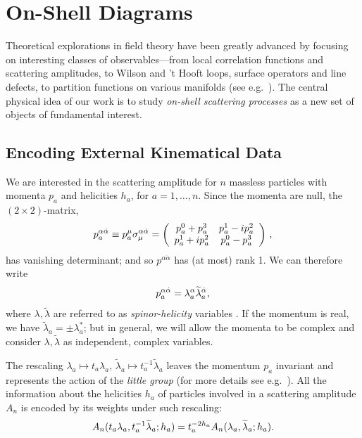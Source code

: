 \documentclass[12pt,hyperref,compress]{JHEP3}
\newcommand{\eq}[1]{\begin{equation}#1\end{equation}}
\begin{document}
\newpage
\section{On-Shell Diagrams}\label{on_shell_diagrams_section}

Theoretical explorations in field theory have been greatly advanced by focusing on interesting classes of observables---from local correlation functions and scattering amplitudes, to Wilson and 't Hooft loops, surface operators and line defects, to partition functions on various manifolds (see e.g.\ \cite{Pestun:2007rz,Gaiotto:2008ak}). The central physical idea of our work is to study {\it on-shell scattering processes} as a new set of objects of fundamental interest.

\subsection{Encoding External Kinematical Data}

We are interested in the scattering amplitude for $n$ massless particles with momenta $p_a$ and helicities $h_a$, for $a=1,\ldots, n$. Since the momenta are null, the $(2\!\times\!2)$-matrix,
\vspace{-.25cm}\eq{p_a^{\alpha\dot{\alpha}}\equiv p_a^\mu \sigma_\mu^{\alpha\dot{\alpha}} = \left(\begin{array}{cc} p_a^0 + p_a^3 & p_a^1 - i p_a^2 \\ p_a^1 + i p_a^2 & p_a^0 - p_a^3 \end{array} \right)\,,\vspace{-.1cm}}
has vanishing determinant; and so $p^{\alpha\dot{\alpha}}$ has (at most) rank 1. We can therefore write\\[-7pt]
\vspace{-.2cm}\eq{p_a^{\alpha\dot{\alpha}} = \lambda_a^\alpha \widetilde{\lambda}_a^{\dot{\alpha}},\vspace{-.15cm}}
where $\lambda, \widetilde \lambda$ are referred to as {\it spinor-helicity} variables \cite{vanderWaerden:1929,Berends:1981rb,DeCausmaecker:1981bg,Gunion:1985vca,Kleiss:1985yh}. If the momentum is real, we have $\widetilde \lambda_a = \pm\lambda_a^*$; but in general, we will allow the momenta to be complex and consider $\lambda, \widetilde \lambda$ as independent, complex variables.

The rescaling $\lambda_a\!\mapsto\! t_a \lambda_a, \, \widetilde \lambda_a \!\mapsto\! t_a^{-1} \widetilde \lambda_a$ leaves the momentum $p_a$ invariant and represents the action of the {\it little group} (for more details see e.g.\ \cite{Weinberg:1995mt, ArkaniHamed:2008gz}). All the information about the helicities $h_a$ of particles involved in a scattering amplitude $A_n$ is encoded by its weights under such rescaling:\\[-10pt]
\vspace{-.0cm}\eq{\label{weights}A_n(t_a \lambda_a, t_a^{-1} \widetilde \lambda_a; h_a) = t_a^{-2 h_a} A_n (\lambda_a,\widetilde \lambda_a; h_a).\vspace{-.0cm}}
\end{document}
